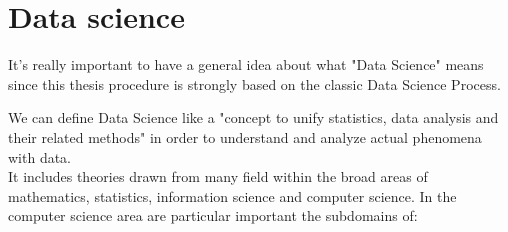 
\section{Data science}
\vspace{-5mm}
It's really important to have a general idea about what "Data Science" means since this thesis procedure is strongly based on the classic Data Science Process.

We can define Data Science like a "concept to unify statistics, data analysis and their related methods" in order to understand and analyze actual phenomena with data.\cite{wiki:DataScience}\\
It includes theories drawn from many field within the broad areas of mathematics, statistics, information science and computer science.
In the computer science area are particular important the subdomains of:\\

